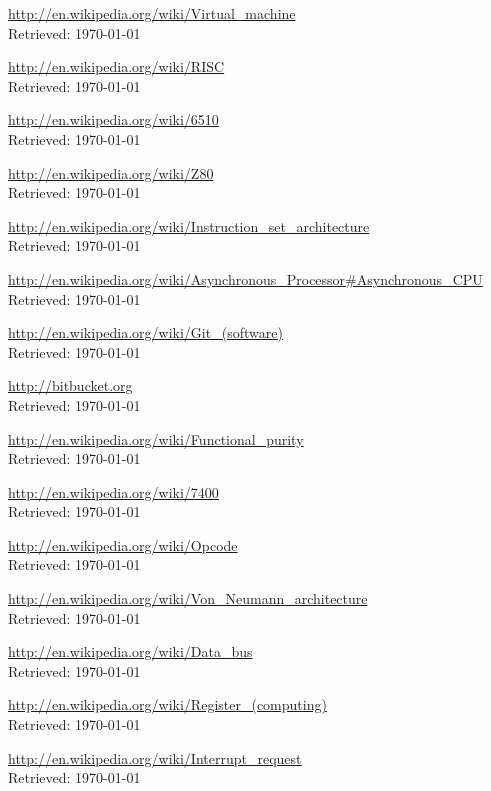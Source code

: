 \documentclass{article}
\begin{document}
\newpage
\begin{thebibliography}{}

{\url{http://en.wikipedia.org/wiki/Virtual_machine}\\
Retrieved: \today}

{\url{http://en.wikipedia.org/wiki/RISC}\\
Retrieved: \today}

{\url{http://en.wikipedia.org/wiki/6510}\\
Retrieved: \today}

{\url{http://en.wikipedia.org/wiki/Z80}\\
Retrieved: \today}

{\url{http://en.wikipedia.org/wiki/Instruction_set_architecture}\\
Retrieved: \today}

{\url{http://en.wikipedia.org/wiki/Asynchronous_Processor#Asynchronous_CPU}\\
Retrieved: \today}

{\url{http://en.wikipedia.org/wiki/Git_(software)}\\
Retrieved: \today}

{\url{http://bitbucket.org}\\
Retrieved: \today}

{\url{http://en.wikipedia.org/wiki/Functional_purity}\\
Retrieved: \today}

{\url{http://en.wikipedia.org/wiki/7400}\\
Retrieved: \today}

{\url{http://en.wikipedia.org/wiki/Opcode}\\
Retrieved: \today}

{\url{http://en.wikipedia.org/wiki/Von_Neumann_architecture}\\
Retrieved: \today}

{\url{http://en.wikipedia.org/wiki/Data_bus}\\
Retrieved: \today}

{\url{http://en.wikipedia.org/wiki/Register_(computing)}\\
Retrieved: \today}

{\url{http://en.wikipedia.org/wiki/Interrupt_request}\\
Retrieved: \today}


\end{thebibliography}
\end{document}
